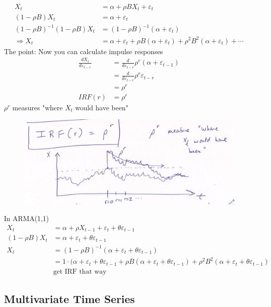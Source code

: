 \begin{align*}
    X_t &= \alpha+ \rho B X_t + \varepsilon_t\\
    (1-\rho B) X_t &= \alpha + \varepsilon_t \\
    (1-\rho B)^{-1}(1-\rho B) X_t &= (1-\rho B)^{-1} (\alpha + \varepsilon_t)\\
    \Rightarrow X_t &= \alpha + \varepsilon_t + \rho B(\alpha + \varepsilon_t)+ \rho^2 B^2(\alpha+\varepsilon_t) + \cdots
\end{align*}
The point: Now you can calculate impulse responses
\begin{align*}
    \frac{dX_t}{d\varepsilon_{t-r}} &= \frac{d}{d \varepsilon_{t-r}} \rho^r (\alpha+\varepsilon_{t-1}) \\
    &= \frac{d}{d\varepsilon_{t-r}} \rho^r \varepsilon_{t-r} \\
    &= \rho^r\\
    IRF(r) &= \rho^r
\end{align*}
$\rho^r$ measures "where $X_t$ would have been"
\begin{figure}[H]
    \centering
    \includegraphics[width=0.75\linewidth]{images/Screenshot 2024-05-21 at 18.16.58.jpg}
\end{figure}

In ARMA(1,1)
\begin{align*}
    X_t &= \alpha + \rho X_{t-1} + \varepsilon_t + \theta \varepsilon_{t-1} \\
    (1-\rho B)X_t &= \alpha + \varepsilon_t + \theta \varepsilon_{t-1} \\
    X_t &= (1-\rho B)^{-1} (\alpha + \varepsilon_t + \theta \varepsilon_{t-1}) \\
&= 1\cdot (\alpha + \varepsilon_t + \theta \varepsilon_{t-1} + \rho B (\alpha + \varepsilon_t + \theta \varepsilon_{t-1}) + \rho^2 B^2(\alpha + \varepsilon_t + \theta\varepsilon_{t-1})\\
&\text{get IRF that way}
\end{align*}

\subsection{Multivariate Time Series}

